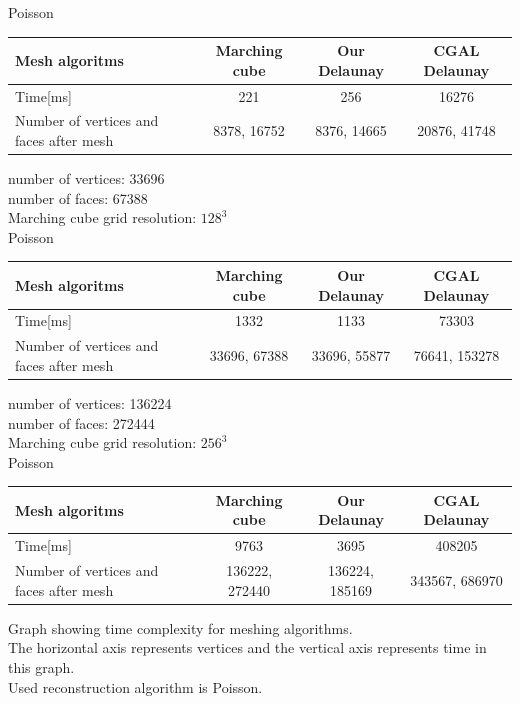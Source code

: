 \documentclass{jsarticle}
\begin{document}
\noindent
Poisson
\begin{table}[htb]
  \begin{tabular}{|l|c|c|c|} \hline
    Mesh algoritms & Marching cube & Our Delaunay & CGAL Delaunay \\  \hline
    Time[ms] & 221 & 256 & 16276\\ \hline
    Number of vertices and faces after mesh & 8378, 16752 & 8376, 14665 &20876, 41748 \\ \hline
  \end{tabular}
\end{table}

\noindent
number of vertices: 33696\\
number of faces: 67388 \\
Marching cube grid resolution: $128^3$\\
Poisson
\begin{table}[htb]
  \begin{tabular}{|l|c|c|c|} \hline
    Mesh algoritms & Marching cube & Our Delaunay & CGAL Delaunay \\  \hline
    Time[ms] & 1332 & 1133 & 73303\\ \hline
    Number of vertices and faces after mesh & 33696, 67388 & 33696, 55877 &76641, 153278 \\ \hline
  \end{tabular}
\end{table}

\noindent
number of vertices: 136224\\
number of faces: 272444\\
Marching cube grid resolution: $256^3$\\
Poisson
\begin{table}[htb]
  \begin{tabular}{|l|c|c|c|} \hline
    Mesh algoritms & Marching cube & Our Delaunay & CGAL Delaunay \\  \hline
    Time[ms] & 9763 & 3695 & 408205\\ \hline
    Number of vertices and faces after mesh & 136222, 272440& 136224, 185169 &343567, 686970 \\ \hline
  \end{tabular}
\end{table}

Graph showing time complexity for meshing algorithms. \\
The horizontal axis represents vertices and the vertical axis represents time in this graph.\\
Used reconstruction algorithm is Poisson.
\end{document}
